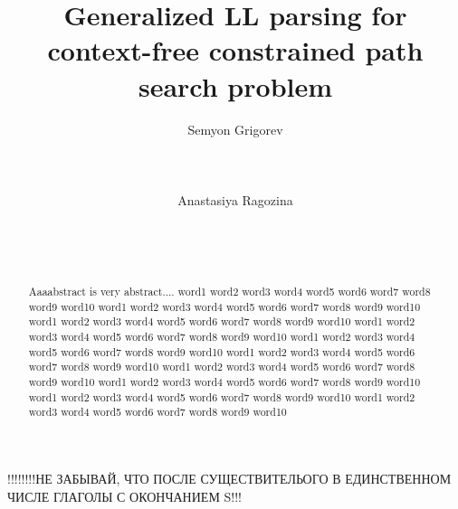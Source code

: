 \documentclass{sig-alternate} %
\begin{document}
\newtheorem{mytheorem}{Theorem}
\newtheorem{lemma}{Lemma}

\makeatletter
\def\@copyrightspace{\relax}
\makeatother

\title{Generalized LL parsing for context-free constrained path search problem}

\sloppy


\author{
\alignauthor
       Semyon Grigorev\\
       \\
       \\
       \\
\alignauthor
       Anastasiya Ragozina\\
       \\
       \\
       \\
}

\maketitle

\begin{abstract}
Aaaabstract is very abstract.... 
word1 word2 word3 word4 word5 word6 word7 word8 word9 word10
word1 word2 word3 word4 word5 word6 word7 word8 word9 word10
word1 word2 word3 word4 word5 word6 word7 word8 word9 word10
word1 word2 word3 word4 word5 word6 word7 word8 word9 word10
word1 word2 word3 word4 word5 word6 word7 word8 word9 word10
word1 word2 word3 word4 word5 word6 word7 word8 word9 word10
word1 word2 word3 word4 word5 word6 word7 word8 word9 word10
word1 word2 word3 word4 word5 word6 word7 word8 word9 word10
word1 word2 word3 word4 word5 word6 word7 word8 word9 word10
word1 word2 word3 word4 word5 word6 word7 word8 word9 word10

\end{abstract}
!!!!!!!!НЕ ЗАБЫВАЙ, ЧТО ПОСЛЕ СУЩЕСТВИТЕЛЬОГО В ЕДИНСТВЕННОМ ЧИСЛЕ ГЛАГОЛЫ С ОКОНЧАНИЕМ S!!!
\end{document}
